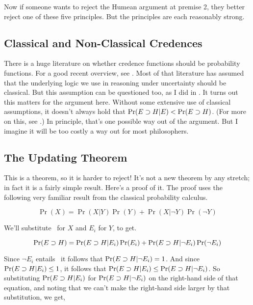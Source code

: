 \noindent Now if someone wants to reject the Humean argument at premise 2, they better reject one of these five principles. But the principles are each reasonably strong.

\subsection{Classical and Non-Classical Credences}
There is a huge literature on whether credence functions should be probability functions. For a good recent overview, see \citet{Hajek2008}. Most of that literature has assumed that the underlying logic we use in reasoning under uncertainty should be classical. But this assumption can be questioned too, as I did in \citet{Weatherson2004}. It turns out this matters for the argument here. Without some extensive use of classical assumptions, it doesn't always hold that $\Pr(E \supset H | E) < \Pr(E \supset H)$. (For more on this, see \citet{JehleWeatherson}.) In principle, that's one possible way out of the argument. But I imagine it will be too costly a way out for most philosophers. 

\subsection{The Updating Theorem}

This is a theorem, so it is harder to reject! It's not a new theorem by any stretch; in fact it is a fairly simple result. Here's a proof of it. The proof uses the following very familiar result from the classical probability calculus.

\begin{equation}
\Pr(X) = \Pr(X | Y)\Pr(Y) + \Pr(X | \neg Y)\Pr(\neg Y)
\end{equation} 

\noindent We'll substitute \ECH\ for $X$ and $E_i$ for $Y$, to get.

\begin{equation}
\Pr(E \supset H) = \Pr(E \supset H | E_i)\Pr(E_i) + \Pr(E \supset H | \neg E_i)\Pr(\neg E_i)
\end{equation} 

\noindent Since $\neg E_i$ entails \ECH\ it follows that $\Pr(E \supset H | \neg E_i) = 1$. And since  $\Pr(E \supset H | E_i) \leq 1$, it follows that  $\Pr(E \supset H | E_i) \leq  \Pr(E \supset H | \neg E_i)$. So substituting   $\Pr(E \supset H |  E_i)$ for $\Pr(E \supset H | \neg E_i)$ on the right-hand side of that equation, and noting that we can't make the right-hand side larger by that substitution, we get,


